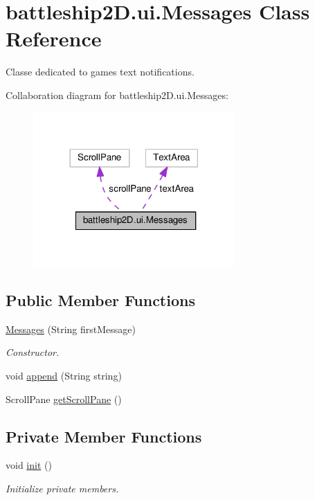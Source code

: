 \hypertarget{classbattleship2D_1_1ui_1_1Messages}{\section{battleship2\-D.\-ui.\-Messages Class Reference}
\label{classbattleship2D_1_1ui_1_1Messages}
}


Classe dedicated to games text notifications.  




Collaboration diagram for battleship2\-D.\-ui.\-Messages\-:\nopagebreak
\begin{figure}[H]
\begin{center}
\leavevmode
\includegraphics[width=218pt]{classbattleship2D_1_1ui_1_1Messages__coll__graph}
\end{center}
\end{figure}
\subsection*{Public Member Functions}
\begin{DoxyCompactItemize}
\item 
\hyperlink{classbattleship2D_1_1ui_1_1Messages_a385a45b9e6fc32f9c5bdc0aadbb8c946}{Messages} (String first\-Message)
\begin{DoxyCompactList}\small\item\em Constructor. \end{DoxyCompactList}\item 
void \hyperlink{classbattleship2D_1_1ui_1_1Messages_ad1f00e18d51362be927c0211d822d843}{append} (String string)
\item 
Scroll\-Pane \hyperlink{classbattleship2D_1_1ui_1_1Messages_a19b4701df84e102c16cbddcf8c49386a}{get\-Scroll\-Pane} ()
\end{DoxyCompactItemize}
\subsection*{Private Member Functions}
\begin{DoxyCompactItemize}
\item 
void \hyperlink{classbattleship2D_1_1ui_1_1Messages_aeca6f562f3f49d69a0bc5a1ab9d6ba9b}{init} ()
\begin{DoxyCompactList}\small\item\em Initialize private members. \end{DoxyCompactList}\end{DoxyCompactItemize}
